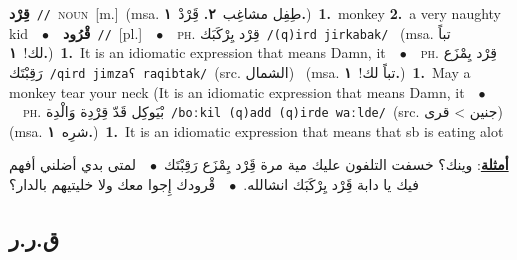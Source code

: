 \documentclass[10pt,a4paper,twoside]{article} %
\begin{document}
\begin{multicols}{2}
{\setlength\topsep{0pt}\textbf{\foreignlanguage{arabic}{قِرْد}}\ {\color{gray}\texttt{//}\color{black}}\ \textsc{noun}\ [m.]\ \color{gray}(msa. \foreignlanguage{arabic}{طِفِل مشاغِب}~\foreignlanguage{arabic}{\textbf{٢.}}  \foreignlanguage{arabic}{قَِرْدْ}~\foreignlanguage{arabic}{\textbf{١.}})\color{black}\ \textbf{1.}~monkey  \textbf{2.}~a very naughty kid\ \ $\bullet$\ \ \setlength\topsep{0pt}\textbf{\foreignlanguage{arabic}{قْرُود}}\ {\color{gray}\texttt{//}\color{black}}\ [pl.]\ \ $\bullet$\ \ \textsc{ph.} \color{gray} \foreignlanguage{arabic}{قِرْد يِرْكَبَك}\color{black}\ {\color{gray}\texttt{/{\sffamily (q)ird jirkabak}/}\color{black}}\ \color{gray} (msa. \foreignlanguage{arabic}{تباً لك!}~\foreignlanguage{arabic}{\textbf{١.}})\color{black}\ \textbf{1.}~It is an idiomatic expression that means Damn, it\ \ $\bullet$\ \ \textsc{ph.} \color{gray} \foreignlanguage{arabic}{قِرْد يِمْزَع رَقِبْتَك}\color{black}\ {\color{gray}\texttt{/{\sffamily qird jimzaʕ raqibtak}/}\color{black}}\ \color{gray}(src. \foreignlanguage{arabic}{الشمال})\color{black}\ \color{gray} (msa. \foreignlanguage{arabic}{تباً لك!}~\foreignlanguage{arabic}{\textbf{١.}})\color{black}\ \textbf{1.}~May a monkey tear your neck (It is an idiomatic expression that means Damn, it\ \ $\bullet$\ \ \textsc{ph.} \color{gray} \foreignlanguage{arabic}{بْيَوكِل قَدّ قِرْدِة وَالْدِة}\color{black}\ {\color{gray}\texttt{/{\sffamily boːkil (q)add (q)irde waːlde}/}\color{black}}\ \color{gray}(src. \foreignlanguage{arabic}{جنين > قرى})\color{black}\ \color{gray} (msa. \foreignlanguage{arabic}{شرِه}~\foreignlanguage{arabic}{\textbf{١.}})\color{black}\ \textbf{1.}~It is an idiomatic expression that means that sb is eating alot\  \begin{flushright}\color{gray}\foreignlanguage{arabic}{\textbf{\underline{\foreignlanguage{arabic}{أمثلة}}}: وينك؟ خسفت التلفون عليك مية مرة قَِرْد يِمْزَع رَقِبْتَك\ $\bullet$\ \  لمتى بدي أضلني أفهم فيك يا دابة قَِرْد يِرْكَبَك انشالله.\ $\bullet$\ \  قْرودك إِجوا معك ولا خليتيهم بالدار؟}\end{flushright}\color{black}} \vspace{2mm}

\vspace{-3mm}
\subsection*{\color{blue}\foreignlanguage{arabic}{ق.ر.ر}\color{blue}{}} 


\end{multicols}
\end{document}
